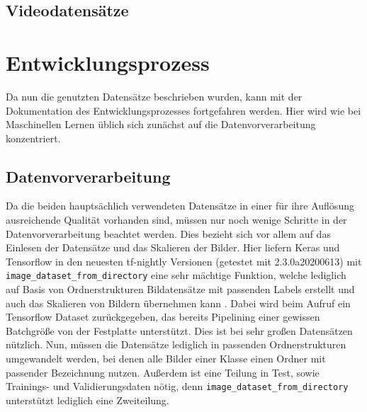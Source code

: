 \documentclass[11pt,bibliography=totocnumbered]{scrartcl}
\begin{document}
\subsection{Videodatensätze}
\section{Entwicklungsprozess}
Da nun die genutzten Datensätze beschrieben wurden, kann mit der Dokumentation des Entwicklungsprozesses fortgefahren werden. Hier wird wie bei Maschinellen Lernen üblich sich zunächst auf die Datenvorverarbeitung konzentriert.
\subsection{Datenvorverarbeitung}
Da die beiden hauptsächlich verwendeten Datensätze in einer für ihre Auflösung ausreichende Qualität vorhanden sind, müssen nur noch wenige Schritte in der Datenvorverarbeitung beachtet werden. Dies bezieht sich vor allem auf das Einlesen der Datensätze und das Skalieren der Bilder. Hier liefern Keras und Tensorflow in den neuesten tf-nightly Versionen (getestet mit 2.3.0a20200613) mit \lstinline[language=pythoninline]|image_dataset_from_directory| eine sehr mächtige Funktion, welche lediglich auf Basis von Ordnerstrukturen Bildatensätze mit passenden Labels erstellt und auch das Skalieren von Bildern übernehmen kann \cite{KERAS_IMAGE_PREPROCESSING}. Dabei wird beim Aufruf ein Tensorflow Dataset zurückgegeben, das bereits Pipelining einer gewissen Batchgröße von der Festplatte unterstützt. Dies ist bei sehr großen Datensätzen nützlich. Nun, müssen die Datensätze lediglich in passenden Ordnerstrukturen umgewandelt werden, bei denen alle Bilder einer Klasse einen Ordner mit passender Bezeichnung nutzen. Außerdem ist eine Teilung in Test, sowie Trainings- und Validierungsdaten nötig, denn \lstinline[language=pythoninline]|image_dataset_from_directory| unterstützt lediglich eine Zweiteilung. 
\end{document}
